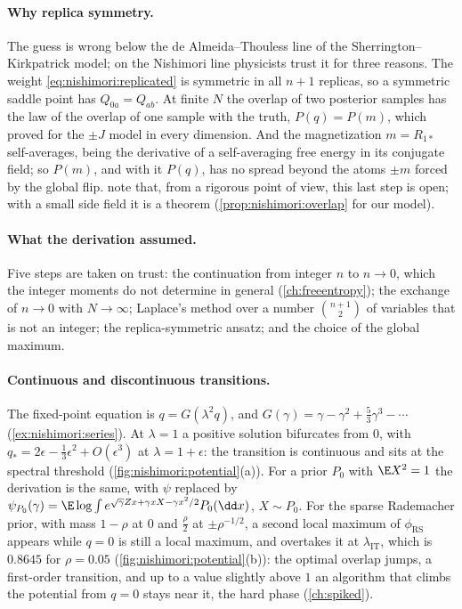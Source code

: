\begin{refsection}
\paragraph{Why replica symmetry.} The guess is wrong below the de Almeida--Thouless line of the Sherrington--Kirkpatrick model; on the Nishimori line physicists trust it for three reasons. The weight \eqref{eq:nishimori:replicated} is symmetric in all $n+1$ replicas, so a symmetric saddle point has $Q_{0a}=Q_{ab}$. At finite $N$ the overlap of two posterior samples has the law of the overlap of one sample with the truth, $P(q)=P(m)$, which \textcite{NishimoriSherrington2001} proved for the $\pm J$ model in every dimension. And the magnetization $m=R_{1*}$ self-averages, being the derivative of a self-averaging free energy in its conjugate field; so $P(m)$, and with it $P(q)$, has no spread beyond the atoms $\pm m$ forced by the global flip. \Textcite[\S II.G]{ZdeborovaKrzakala2016} note that, from a rigorous point of view, this last step is open; with a small side field it is a theorem (\cref{prop:nishimori:overlap} for our model).

\paragraph{What the derivation assumed.} Five steps are taken on trust: the continuation from integer $n$ to $n\to0$, which the integer moments do not determine in general (\cref{ch:freeentropy}); the exchange of $n\to0$ with $N\to\infty$; Laplace's method over a number $\binom{n+1}2$ of variables that is not an integer; the replica-symmetric ansatz; and the choice of the global maximum.

\paragraph{Continuous and discontinuous transitions.} The fixed-point equation is $q=G(\lambda^2q)$, and $G(\gamma)=\gamma-\gamma^2+\frac53\gamma^3-\cdots$ (\cref{ex:nishimori:series}). At $\lambda=1$ a positive solution bifurcates from $0$, with $q_*=2\epsilon-\frac13\epsilon^2+O(\epsilon^3)$ at $\lambda=1+\epsilon$: the transition is continuous and sits at the spectral threshold (\cref{fig:nishimori:potential}(a)). For a prior $P_0$ with $\E X^2=1$ the derivation is the same, with $\psi$ replaced by $\psi_{P_0}(\gamma)=\E\log\int e^{\sqrt\gamma Zx+\gamma xX-\gamma x^2/2}P_0(\dd x)$, $X\sim P_0$. For the sparse Rademacher prior, with mass $1-\rho$ at $0$ and $\frac\rho2$ at $\pm\rho^{-1/2}$, a second local maximum of $\phi_{\mathrm{RS}}$ appears while $q=0$ is still a local maximum, and overtakes it at $\lambda_{\mathrm{IT}}$, which is $0.8645$ for $\rho=0.05$ (\cref{fig:nishimori:potential}(b)): the optimal overlap jumps, a first-order transition, and up to a value slightly above $1$ an algorithm that climbs the potential from $q=0$ stays near it, the hard phase (\cref{ch:spiked}).


\end{refsection}
